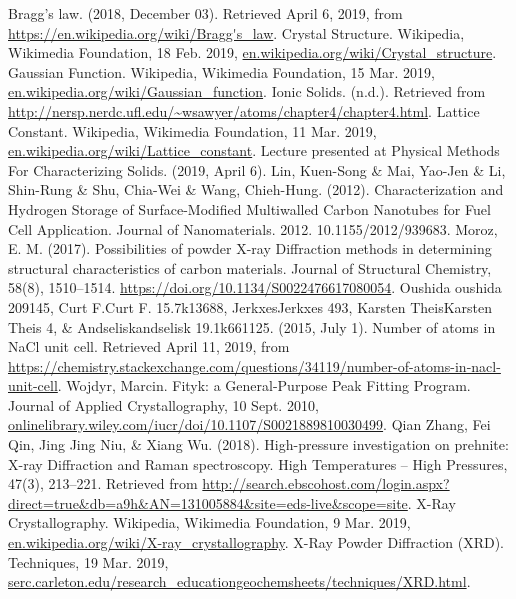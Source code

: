 \documentclass[twocolumn]{article}
\begin{document}
\begin{thebibliography}{13}
Bragg's law. (2018, December 03). Retrieved April 6, 2019, from \url{https://en.wikipedia.org/wiki/Bragg's_law}.
Crystal Structure. Wikipedia, Wikimedia Foundation, 18 Feb. 2019, \url{en.wikipedia.org/wiki/Crystal_structure}.
Gaussian Function. Wikipedia, Wikimedia Foundation, 15 Mar. 2019, \url{en.wikipedia.org/wiki/Gaussian_function}.
Ionic Solids. (n.d.). Retrieved from \url{http://nersp.nerdc.ufl.edu/~wsawyer/atoms/chapter4/chapter4.html}.
Lattice Constant. Wikipedia, Wikimedia Foundation, 11 Mar. 2019, \url{en.wikipedia.org/wiki/Lattice_constant}.
Lecture presented at Physical Methods For Characterizing Solids. (2019, April 6).
Lin, Kuen-Song \& Mai, Yao-Jen \& Li, Shin-Rung \& Shu, Chia-Wei \& Wang, Chieh-Hung. (2012). Characterization and Hydrogen Storage of Surface-Modified Multiwalled Carbon Nanotubes for Fuel Cell Application. Journal of Nanomaterials. 2012. 10.1155/2012/939683. 
Moroz, E. M. (2017). Possibilities of powder X-ray Diffraction methods in determining structural characteristics of carbon materials. Journal of Structural Chemistry, 58(8), 1510–1514. \url{https://doi.org/10.1134/S0022476617080054}.
Oushida oushida 209145, Curt F.Curt F. 15.7k13688, JerkxesJerkxes 493, Karsten TheisKarsten Theis 4, \& Andseliskandselisk 19.1k661125. (2015, July 1). Number of atoms in NaCl unit cell. Retrieved April 11, 2019, from \url{https://chemistry.stackexchange.com/questions/34119/number-of-atoms-in-nacl-unit-cell}.
Wojdyr, Marcin. Fityk: a General-Purpose Peak Fitting Program. Journal of Applied Crystallography, 10 Sept. 2010, \url{onlinelibrary.wiley.com/iucr/doi/10.1107/S0021889810030499}.
Qian Zhang, Fei Qin, Jing Jing Niu, \& Xiang Wu. (2018). High-pressure investigation on prehnite: X-ray Diffraction and Raman spectroscopy. High Temperatures -- High Pressures, 47(3), 213–221. Retrieved from \url{http://search.ebscohost.com/login.aspx?direct=true&db=a9h&AN=131005884&site=eds-live&scope=site}.
X-Ray Crystallography. Wikipedia, Wikimedia Foundation, 9 Mar. 2019, \url{en.wikipedia.org/wiki/X-ray_crystallography}.
X-Ray Powder Diffraction (XRD). Techniques, 19 Mar. 2019, \url{serc.carleton.edu/research_educationgeochemsheets/techniques/XRD.html}.
\end{thebibliography}
\end{document}
